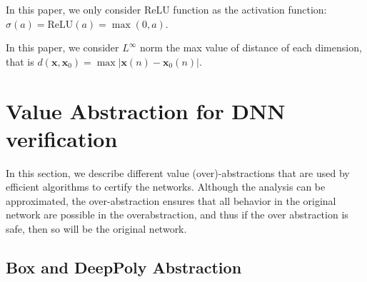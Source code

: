 \documentclass{llncs}
\newcommand{\ReLU}{\mathrm{ReLU}}
\begin{document}
In this paper, we only consider $\ReLU$ function as the activation function: $\sigma(a)=\ReLU(a)=\max(0,a)$. 

In this paper, we consider $L^{\infty}$ norm the max value of distance of each dimension, that is $d(\boldsymbol{x},\boldsymbol{x}_0)=\max |\boldsymbol{x}(n)-\boldsymbol{x}_0(n)|$. 
\fi


\section{Value Abstraction for DNN verification}

In this section, we describe different value (over)-abstractions that are used by efficient algorithms to certify the networks. Although the analysis can be approximated, the over-abstraction ensures that all behavior in the original network are possible in the overabstraction, and thus if the over abstraction is safe, then so will be the original network.

\subsection{Box and DeepPoly Abstraction}

	
\end{document}
